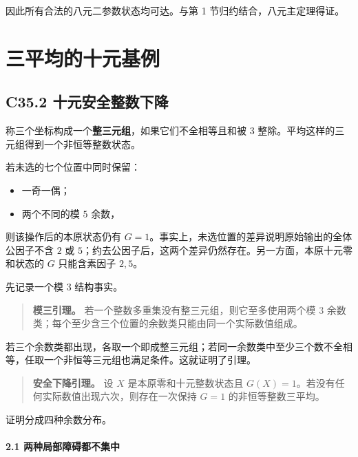 \documentclass[11pt,a4paper]{article}
\newcommand{\tightlist}{\setlength{\itemsep}{0pt}\setlength{\parskip}{0pt}}
\theoremstyle{definition}
\numberwithin{equation}{section}
\begin{document}
{因此所有合法的八元二参数状态均可达。与第} {1} {节归约结合，八元主定理得证。}


\section{三平均的十元基例}\label{construct:triple-ten}
\subsection*{\texorpdfstring{{C35.2} {十元安全整数下降}}{C35.2 十元安全整数下降}}\label{C35-h230}

{称三个坐标构成一个}\textbf{{整三元组}}{，如果它们不全相等且和被} \(3\) {整除。平均这样的三元组得到一个非恒等整数状态。}

{若未选的七个位置中同时保留：}

\begin{itemize}
\tightlist
\item
  {一奇一偶；}
\item
  {两个不同的模} \(5\) {余数，}
\end{itemize}

{则该操作后的本原状态仍有} \(G=1\){。事实上，未选位置的差异说明原始输出的全体公因子不含} \(2\) {或} \(5\){；约去公因子后，这两个差异仍然存在。另一方面，本原十元零和状态的} \(G\) {只能含素因子} \(2,5\){。}

{先记录一个模} \(3\) {结构事实。}

\begin{quote}
\textbf{{模三引理。}} {若一个整数多重集没有整三元组，则它至多使用两个模} \(3\) {余数类；每个至少含三个位置的余数类只能由同一个实际数值组成。}
\end{quote}

{若三个余数类都出现，各取一个即成整三元组；若同一余数类中至少三个数不全相等，任取一个非恒等三元组也满足条件。这就证明了引理。}

\begin{quote}
\textbf{{安全下降引理。}} {设} \(X\) {是本原零和十元整数状态且} \(G(X)=1\){。若没有任何实际数值出现六次，则存在一次保持} \(G=1\) {的非恒等整数三平均。}
\end{quote}

{证明分成四种余数分布。}

\paragraph*{\texorpdfstring{{2.1} {两种局部障碍都不集中}}{2.1 两种局部障碍都不集中}}\label{C35-h231}
\end{document}
